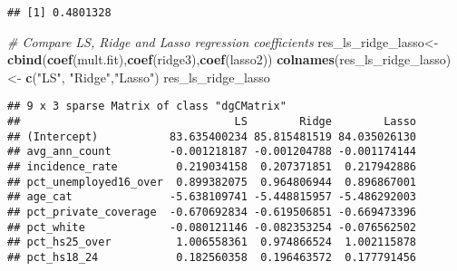 \documentclass[]{article}
\newenvironment{Shaded}{\begin{snugshade}}{\end{snugshade}}
\newcommand{\KeywordTok}[1]{\textcolor[rgb]{0.13,0.29,0.53}{\textbf{#1}}}
\newcommand{\StringTok}[1]{\textcolor[rgb]{0.31,0.60,0.02}{#1}}
\newcommand{\CommentTok}[1]{\textcolor[rgb]{0.56,0.35,0.01}{\textit{#1}}}
\newcommand{\NormalTok}[1]{#1}
\begin{document}
\begin{verbatim}
## [1] 0.4801328
\end{verbatim}

\begin{Shaded}
\begin{Highlighting}[]
\CommentTok{# Compare LS, Ridge and Lasso regression coefficients}
\NormalTok{res_ls_ridge_lasso<-}\StringTok{ }\KeywordTok{cbind}\NormalTok{(}\KeywordTok{coef}\NormalTok{(mult.fit),}\KeywordTok{coef}\NormalTok{(ridge3),}\KeywordTok{coef}\NormalTok{(lasso2))}
\KeywordTok{colnames}\NormalTok{(res_ls_ridge_lasso) <-}\StringTok{ }\KeywordTok{c}\NormalTok{(}\StringTok{"LS"}\NormalTok{, }\StringTok{"Ridge"}\NormalTok{,}\StringTok{"Lasso"}\NormalTok{)}
\NormalTok{res_ls_ridge_lasso}
\end{Highlighting}
\end{Shaded}

\begin{verbatim}
## 9 x 3 sparse Matrix of class "dgCMatrix"
##                                 LS        Ridge        Lasso
## (Intercept)           83.635400234 85.815481519 84.035026130
## avg_ann_count         -0.001218187 -0.001204788 -0.001174144
## incidence_rate         0.219034158  0.207371851  0.217942886
## pct_unemployed16_over  0.899382075  0.964806944  0.896867001
## age_cat               -5.638109741 -5.448815957 -5.486292003
## pct_private_coverage  -0.670692834 -0.619506851 -0.669473396
## pct_white             -0.080121146 -0.082353254 -0.076562502
## pct_hs25_over          1.006558361  0.974866524  1.002115878
## pct_hs18_24            0.182560358  0.196463572  0.177791456
\end{verbatim}
\end{document}
